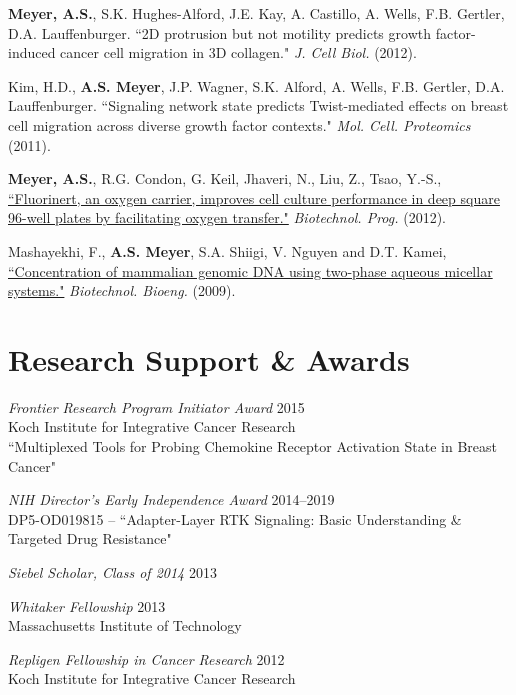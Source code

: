 \documentclass[11pt]{res}
\begin{document}
\begin{resume}
{{\bf Meyer, A.S.}, S.K. Hughes-Alford, J.E. Kay, A. Castillo, A. Wells, F.B. Gertler, D.A. Lauffenburger. ``2D protrusion but not motility predicts growth factor-induced cancer cell migration in 3D collagen." {\sl J. Cell Biol.} (2012).

Kim, H.D., {\bf A.S. Meyer}, J.P. Wagner, S.K. Alford, A. Wells, F.B. Gertler, D.A. Lauffenburger. ``Signaling network state predicts Twist-mediated effects on breast cell migration across diverse growth factor contexts." {\sl Mol. Cell. Proteomics} (2011).

{\bf Meyer, A.S.}, R.G. Condon, G. Keil, Jhaveri, N., Liu, Z., Tsao, Y.-S., \href{http://www.ncbi.nlm.nih.gov/pubmed/21954223}{``Fluorinert, an oxygen carrier, improves cell culture performance in deep square 96-well plates by facilitating oxygen transfer."} {\sl Biotechnol. Prog.} (2012).

Mashayekhi, F., {\bf A.S. Meyer}, S.A. Shiigi, V. Nguyen and D.T. Kamei, \href{http://www.ncbi.nlm.nih.gov/pubmed/19061237}{``Concentration of mammalian genomic DNA using two-phase aqueous micellar systems."} {\sl Biotechnol. Bioeng.} (2009).

}



\section{Research Support \& Awards}

{\sl Frontier Research Program Initiator Award} \hfill 2015 \\
Koch Institute for Integrative Cancer Research\\
``Multiplexed Tools for Probing Chemokine Receptor Activation State in Breast Cancer"

{\sl NIH Director's Early Independence Award}  \hfill 2014--2019 \\
DP5-OD019815 -- ``Adapter-Layer RTK Signaling: Basic Understanding \& Targeted Drug Resistance"

{\sl Siebel Scholar, Class of 2014} \hfill 2013 

{\sl Whitaker Fellowship}  \hfill 2013\\
Massachusetts Institute of Technology

{\sl Repligen Fellowship in Cancer Research} \hfill 2012 \\
Koch Institute for Integrative Cancer Research 


\end{resume}
\end{document}
